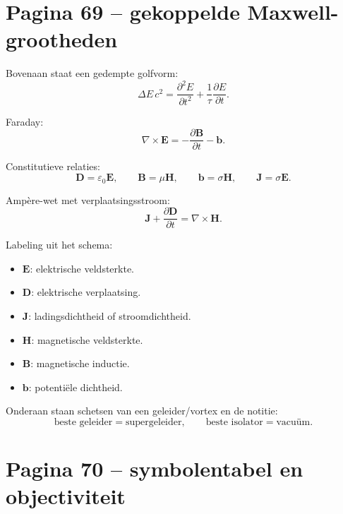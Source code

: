 \documentclass[11pt,a4paper]{article}
\newcommand{\vect}[1]{\mathbf{#1}}
\begin{document}
\section*{Pagina 69 -- gekoppelde Maxwell-grootheden}

Bovenaan staat een gedempte golfvorm:
$$
\Delta E\,c^{2}
=
\frac{\partial^{2}E}{\partial t^{2}}
+
\frac{1}{\tau}
\frac{\partial E}{\partial t}.
$$

Faraday:
$$
\nabla\times\vect{E}
=
-\frac{\partial\vect{B}}{\partial t}
-
\vect{b}.
$$

Constitutieve relaties:
$$
\vect{D}=\varepsilon_0\vect{E},
\qquad
\vect{B}=\mu\vect{H},
\qquad
\vect{b}=\sigma\vect{H},
\qquad
\vect{J}=\sigma\vect{E}.
$$

Ampère-wet met verplaatsingsstroom:
$$
\vect{J}
+
\frac{\partial\vect{D}}{\partial t}
=
\nabla\times\vect{H}.
$$

Labeling uit het schema:
\begin{itemize}
\item $\vect{E}$: elektrische veldsterkte.
\item $\vect{D}$: elektrische verplaatsing.
\item $\vect{J}$: ladingsdichtheid of stroomdichtheid.
\item $\vect{H}$: magnetische veldsterkte.
\item $\vect{B}$: magnetische inductie.
\item $\vect{b}$: potentiële dichtheid.
\end{itemize}

Onderaan staan schetsen van een geleider/vortex en de notitie:
$$
\text{beste geleider}=\text{supergeleider},
\qquad
\text{beste isolator}=\text{vacuüm}.
$$

\section*{Pagina 70 -- symbolentabel en objectiviteit}
\end{document}

